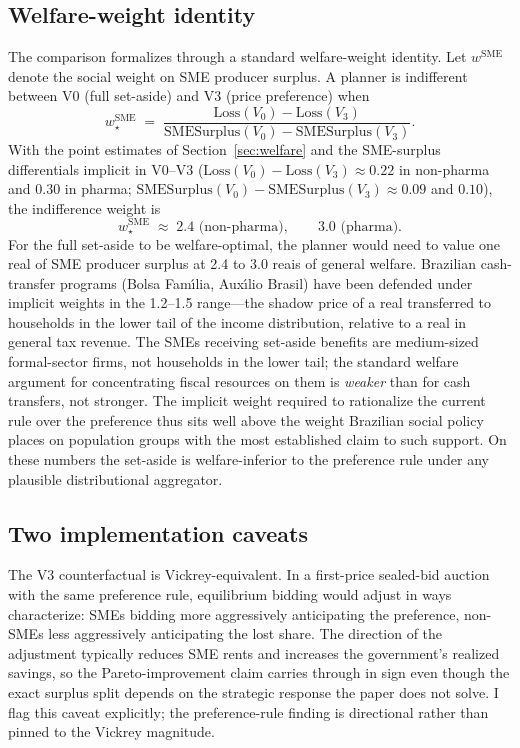 \subsection{Welfare-weight identity}

The comparison formalizes through a standard welfare-weight identity. Let $w^{\text{SME}}$ denote the social weight on SME producer surplus. A planner is indifferent between V0 (full set-aside) and V3 (price preference) when
\begin{equation}\label{eq:welfare_weight}
w^{\text{SME}}_\star \;=\; \frac{\mathrm{Loss}(V_0) - \mathrm{Loss}(V_3)}{\mathrm{SMESurplus}(V_0) - \mathrm{SMESurplus}(V_3)}.
\end{equation}
With the point estimates of Section~\ref{sec:welfare} and the SME-surplus differentials implicit in V0--V3 ($\mathrm{Loss}(V_0) - \mathrm{Loss}(V_3) \approx 0.22$ in non-pharma and $0.30$ in pharma; $\mathrm{SMESurplus}(V_0) - \mathrm{SMESurplus}(V_3) \approx 0.09$ and $0.10$), the indifference weight is
\[
w^{\text{SME}}_\star \;\approx\; 2.4 \text{ (non-pharma)}, \qquad 3.0 \text{ (pharma)}.
\]
For the full set-aside to be welfare-optimal, the planner would need to value one real of SME producer surplus at 2.4 to 3.0 reais of general welfare. Brazilian cash-transfer programs (Bolsa Fam\'{\i}lia, Aux\'{\i}lio Brasil) have been defended under implicit weights in the 1.2--1.5 range---the shadow price of a real transferred to households in the lower tail of the income distribution, relative to a real in general tax revenue. The SMEs receiving set-aside benefits are medium-sized formal-sector firms, not households in the lower tail; the standard welfare argument for concentrating fiscal resources on them is \emph{weaker} than for cash transfers, not stronger. The implicit weight required to rationalize the current rule over the preference thus sits well above the weight Brazilian social policy places on population groups with the most established claim to such support. On these numbers the set-aside is welfare-inferior to the preference rule under any plausible distributional aggregator.

\subsection{Two implementation caveats}

The V3 counterfactual is Vickrey-equivalent. In a first-price sealed-bid auction with the same preference rule, equilibrium bidding would adjust in ways \citet{maskinriley2000} characterize: SMEs bidding more aggressively anticipating the preference, non-SMEs less aggressively anticipating the lost share. The direction of the adjustment typically reduces SME rents and increases the government's realized savings, so the Pareto-improvement claim carries through in sign even though the exact surplus split depends on the strategic response the paper does not solve. I flag this caveat explicitly; the preference-rule finding is directional rather than pinned to the Vickrey magnitude.

